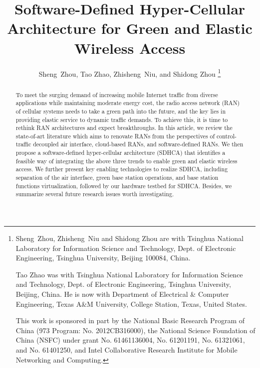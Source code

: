 \documentclass[12pt, draftclsnofoot,onecolumn]{IEEEtran}
\begin{document}
\title{Software-Defined Hyper-Cellular Architecture for Green and Elastic Wireless Access}

\author{Sheng~Zhou, Tao Zhao, Zhisheng~Niu, and Shidong Zhou
\thanks{Sheng~Zhou, Zhisheng~Niu and Shidong Zhou are with Tsinghua National Laboratory for Information Science and Technology, Dept. of
Electronic Engineering, Tsinghua University, Beijing 100084, China.

Tao Zhao was with Tsinghua National Laboratory for Information Science and Technology, Dept. of
Electronic Engineering, Tsinghua University, Beijing, China. He is now with Department of Electrical \& Computer Engineering, Texas A\&M University, College Station, Texas, United States.

This work is sponsored in part by the National Basic Research Program of China (973 Program: No. 2012CB316000), the National Science Foundation of China (NSFC) under grant No. 61461136004, No. 61201191, No. 61321061, and No. 61401250, and Intel Collaborative Research Institute for Mobile Networking and Computing. }}

\maketitle

\begin{abstract}

To meet the surging demand of increasing mobile Internet traffic from diverse
applications while maintaining moderate energy cost, the radio access network
(RAN) of cellular systems needs to take a green path into the future,
and the key lies in providing elastic service to dynamic traffic
demands. To achieve this, it is time to rethink RAN architectures and expect
breakthroughs.  In this article, we review the state-of-art literature which
aims to renovate RANs from the perspectives of control-traffic decoupled air
interface, cloud-based RANs, and software-defined RANs. We then propose a
software-defined hyper-cellular architecture (SDHCA) that identifies a feasible
way of integrating the above three trends to enable green and elastic wireless
access. We further present key enabling technologies to realize
SDHCA, including separation of the air interface, green base station
operations, and base station functions virtualization, followed by our hardware testbed for SDHCA. Besides, we summarize
several future research issues worth investigating.

\end{abstract}
\end{document}
